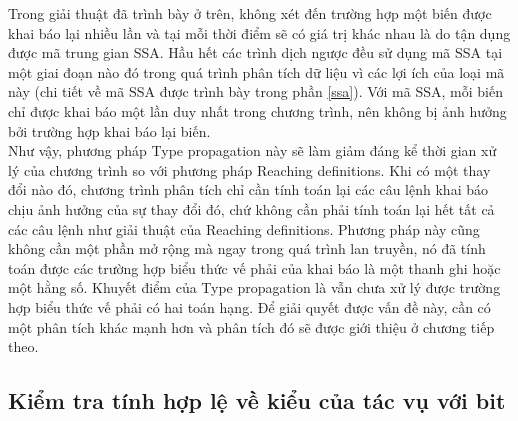 Trong giải thuật đã trình bày ở trên, không xét đến trường hợp một biến được khai báo lại nhiều lần và tại mỗi thời điểm sẽ có giá trị khác nhau là do tận dụng được mã trung gian SSA. Hầu hết các trình dịch ngược đều sử dụng mã SSA tại một giai đoạn nào đó trong quá trình phân tích dữ liệu vì các lợi ích của loại mã này (chi tiết về mã SSA được trình bày trong phần \ref{ssa}). Với mã SSA, mỗi biến chỉ được khai báo một lần duy nhất trong chương trình, nên không bị ảnh hưởng bởi trường hợp khai báo lại biến.\\

Như vậy, phương pháp Type propagation này sẽ làm giảm đáng kể thời gian xử lý của chương trình so với phương pháp Reaching definitions. Khi có một thay đổi nào đó, chương trình phân tích chỉ cần tính toán lại các câu lệnh khai báo chịu ảnh hưởng của sự thay đổi đó, chứ không cần phải tính toán lại hết tất cả các câu lệnh như giải thuật của Reaching definitions. Phương pháp này cũng không cần một phần mở rộng mà ngay trong quá trình lan truyền, nó đã tính toán được các trường hợp biểu thức vế phải của khai báo là một thanh ghi hoặc một hằng số. Khuyết điểm của Type propagation là vẫn chưa xử lý được trường hợp biểu thức vế phải có hai toán hạng. Để giải quyết được vấn đề này, cần có một phân tích khác mạnh hơn và phân tích đó sẽ được giới thiệu ở chương tiếp theo.
\subsection{Kiểm tra tính hợp lệ về kiểu của tác vụ với bit}

\label{sec:laststep}

